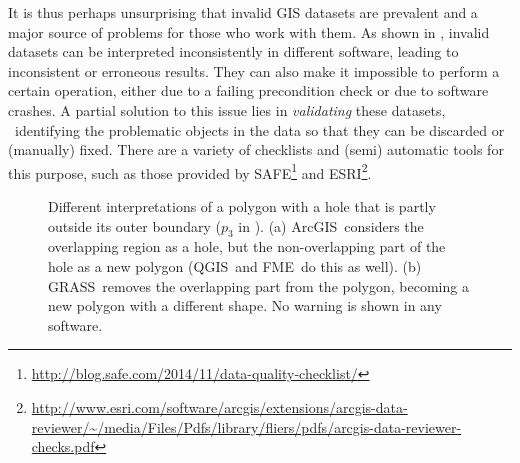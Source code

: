It is thus perhaps unsurprising that invalid GIS datasets are prevalent \citep[Ch.~7]{Panigrahi14} and a major source of problems for those who work with them.
As shown in , invalid datasets can be interpreted inconsistently in different software, leading to inconsistent or erroneous results.
They can also make it impossible to perform a certain operation, either due to a failing precondition check or due to software crashes.
A partial solution to this issue lies in \emph{validating} these datasets, \ie\ identifying the problematic objects in the data so that they can be discarded or (manually) fixed.
There are a variety of checklists and (semi) automatic tools for this purpose, such as those provided by SAFE\footnote{\url{http://blog.safe.com/2014/11/data-quality-checklist/}} and ESRI\footnote{\url{http://www.esri.com/software/arcgis/extensions/arcgis-data-reviewer/~/media/Files/Pdfs/library/fliers/pdfs/arcgis-data-reviewer-checks.pdf}}.
\begin{figure}[tbp]
\centering
{}
\quad
{}
\caption[Different interpretations of a polygon]{Different interpretations of a polygon with a hole that is partly outside its outer boundary ($p_3$ in ).
(a) ArcGIS\protect\footnotemark\ considers the overlapping region as a hole, but the non-overlapping part of the hole as a new polygon (QGIS\protect\footnotemark\ and FME\protect\footnotemark\ do this as well).
(b) GRASS\protect\footnotemark\ removes the overlapping part from the polygon, becoming a new polygon with a different shape. No warning is shown in any software.}
\label{fig:partially}
\end{figure}

